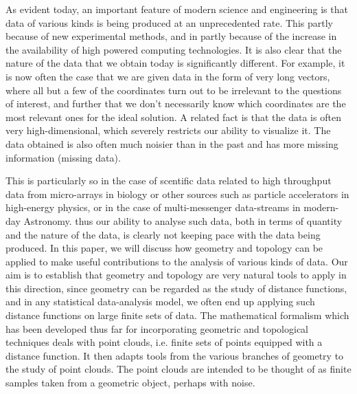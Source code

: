 As evident today, an important feature of modern science and engineering is that data of various kinds is being produced at an unprecedented rate. \cite{02.6_2009TDAChallenges} \cite{18.2_2018TDAonBigData} This partly because of new experimental methods, and in partly because of the increase in the availability of high powered computing technologies.\cite{18.0_2016topologicalBigChem} \cite{18.1_2017TopoBigdataPipeline} It is also clear that the nature of the data that we obtain today is significantly different. For example, it is now often the case that we are given data in the form of very long vectors, where all but a few of the coordinates turn out to be irrelevant to the questions of interest, and further that we don't necessarily know which coordinates are the most relevant ones for the ideal solution. A related fact is that the data is often very high-dimensional, which severely restricts our ability to visualize it. The data obtained is also often much noisier than in the past and has more missing information (missing data).\cite{02_carlsson2009topology}

This is particularly so in the case of scentific data related to high throughput data \cite{11.0_chazal2017TopoDataScience}from micro-arrays in biology or other sources such as particle accelerators in high-energy physics, or in the case of multi-messenger data-streams in modern-day Astronomy. thus our ability to analyse such data, both in terms of quantity and the nature of the data, is  clearly not keeping pace with the data being produced.\cite{18.2_2018TDAonBigData} In this paper, we will discuss how geometry and topology can be applied to make useful contributions to the analysis of various kinds of data. Our aim is to establish that geometry and topology are very natural tools to apply in this direction, since geometry can be regarded as the study of distance functions, and in any statistical data-analysis model, we often end up applying such distance functions on large finite sets of data. The mathematical formalism which has been developed thus far for incorporating geometric and topological techniques deals with point clouds, i.e. finite sets of points equipped with a distance function. It then adapts tools from the various branches of geometry to the study of point clouds. The point clouds are intended to be thought of as finite samples taken from a geometric object, perhaps with noise.\cite{01_GCarlssonEpstein2011} \cite{01.9_2007MapperPBG} \cite{01.3_2016TDANewOpportunities}

